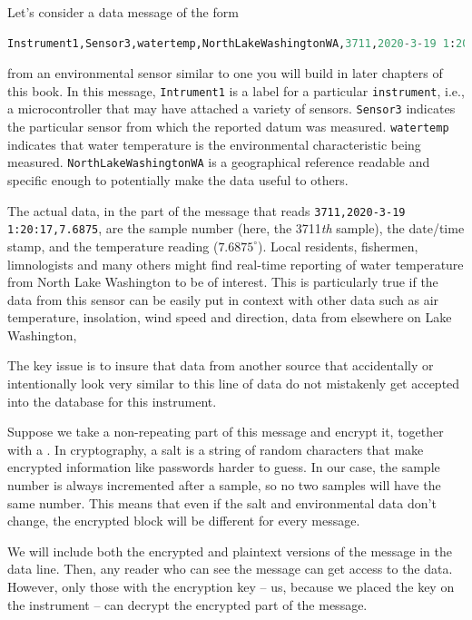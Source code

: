 Let's consider a data message of the form 
\begin{lstlisting}[language=Python]
Instrument1,Sensor3,watertemp,NorthLakeWashingtonWA,3711,2020-3-19 1:20:17,7.6875
\end{lstlisting}
from an environmental sensor similar to one you will build in later chapters of this book.
In this message, \lstinline{Intrument1} is a label for a particular \texttt{instrument}, i.e., a microcontroller that may have attached a variety of sensors.
\lstinline{Sensor3} indicates the particular sensor from which the reported datum was measured.
\lstinline{watertemp} indicates that water temperature is the environmental characteristic being measured.
\lstinline{NorthLakeWashingtonWA} is a geographical reference readable and specific enough to potentially make the data useful to others. 

The actual data, in the part of the message that reads \lstinline{3711,2020-3-19 1:20:17,7.6875}, are the sample number (here, the 3711\textit{th} sample), the date/time stamp, and the temperature reading ($7.6875^\circ$).
Local residents, fishermen, limnologists and many others might find real-time reporting of water temperature from North Lake Washington to be of interest.
This is particularly true if the data from this sensor can be easily put in context with other data such as air temperature, insolation, wind speed and direction, data from elsewhere on Lake Washington, \etc

The key issue is to insure that data from another source that accidentally or intentionally look very similar to this line of data do not mistakenly get accepted into the database for this instrument.

Suppose we take a non-repeating part of this message and encrypt it, together with a .
In cryptography, a salt is a string of random characters that make encrypted information like passwords harder to guess.
In our case, the sample number is always incremented after a sample, so no two samples will have the same number.
This means that even if the salt and environmental data don't change, the encrypted block will be different for every message.

We will include both the encrypted and plaintext versions of the message in the data line.
Then, any reader who can see the message can get access to the data.
However, only those with the encryption key -- us, because we placed the key on the instrument -- can decrypt the encrypted part of the message.

